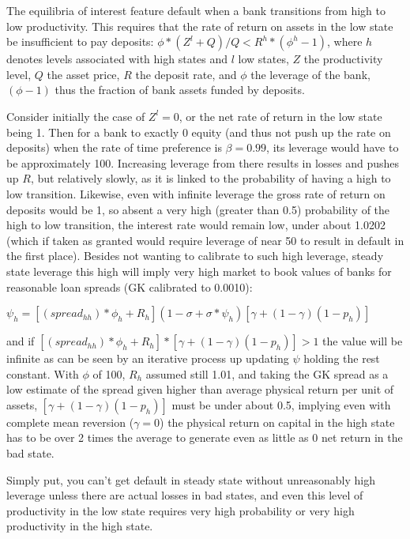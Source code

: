 \documentclass[english]{article}
\begin{document}
The equilibria of interest feature default when a bank transitions from high to low productivity. This 
requires that the rate of return on assets in the low state be insufficient to pay deposits: 
$\phi*(Z^l + Q)/Q < R^h*(\phi^h - 1)$, where $h$ denotes levels associated with high states and 
$l$ low states, $Z$ the productivity level, $Q$ the asset price, $R$ the deposit rate, and $\phi$ the 
leverage of the bank, $(\phi - 1)$ thus the fraction of bank assets funded by deposits. 

Consider initially the case of $Z^l=0$, or the net rate of return in the low state being 1. Then for 
a bank to exactly 0 equity (and thus not push up the rate on deposits) when the rate of time preference is $\beta = 0.99$, its leverage would have 
to be approximately 100. Increasing leverage from there results in losses and pushes up $R$, but 
relatively slowly, as it is linked to the probability of having a high to low transition. Likewise, 
even with infinite leverage the gross rate of return on deposits would be 1, so absent a very high 
(greater than 0.5) probability of the high to low transition, the interest rate would remain low, under 
about 1.0202 (which if taken as granted would require leverage of near 50 to result in default in the 
first place). Besides not wanting to calibrate to such high leverage, steady state leverage this high 
will imply very high market to book values of banks for reasonable loan spreads (GK calibrated to 0.0010): 

$\psi_h = [(spread_{hh})*\phi_h + R_h](1-\sigma+\sigma*\psi_h)[\gamma + (1-\gamma)(1-p_h)]$

and if $[(spread_{hh})*\phi_h + R_h]*[\gamma + (1-\gamma)(1-p_h)] > 1$ the value will be infinite as 
can be seen by an iterative process up updating $\psi$ holding the rest constant. With $\phi$ of 100, $R_h$ 
assumed still 1.01, and taking the GK spread as a low estimate of the spread given higher than average 
physical return per unit of assets, $[\gamma + (1-\gamma)(1-p_h)]$ must be under about 0.5, implying 
even with complete mean reversion ($\gamma = 0$) the physical return on capital in the high state has 
to be over 2 times the average to generate even as little as 0 net return in the bad state. 

Simply put, you can't get default in steady state without unreasonably high leverage unless there are 
actual losses in bad states, and even this level of productivity in the low state requires very high probability 
or very high productivity in the high state.
\end{document}
